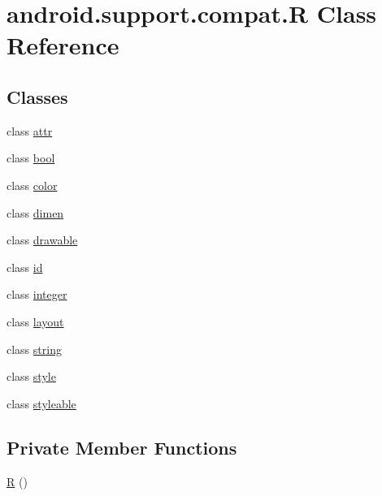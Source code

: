 \hypertarget{classandroid_1_1support_1_1compat_1_1_r}{}\section{android.\+support.\+compat.\+R Class Reference}
\label{classandroid_1_1support_1_1compat_1_1_r}
\subsection*{Classes}
\begin{DoxyCompactItemize}
\item 
class \mbox{\hyperlink{classandroid_1_1support_1_1compat_1_1_r_1_1attr}{attr}}
\item 
class \mbox{\hyperlink{classandroid_1_1support_1_1compat_1_1_r_1_1bool}{bool}}
\item 
class \mbox{\hyperlink{classandroid_1_1support_1_1compat_1_1_r_1_1color}{color}}
\item 
class \mbox{\hyperlink{classandroid_1_1support_1_1compat_1_1_r_1_1dimen}{dimen}}
\item 
class \mbox{\hyperlink{classandroid_1_1support_1_1compat_1_1_r_1_1drawable}{drawable}}
\item 
class \mbox{\hyperlink{classandroid_1_1support_1_1compat_1_1_r_1_1id}{id}}
\item 
class \mbox{\hyperlink{classandroid_1_1support_1_1compat_1_1_r_1_1integer}{integer}}
\item 
class \mbox{\hyperlink{classandroid_1_1support_1_1compat_1_1_r_1_1layout}{layout}}
\item 
class \mbox{\hyperlink{classandroid_1_1support_1_1compat_1_1_r_1_1string}{string}}
\item 
class \mbox{\hyperlink{classandroid_1_1support_1_1compat_1_1_r_1_1style}{style}}
\item 
class \mbox{\hyperlink{classandroid_1_1support_1_1compat_1_1_r_1_1styleable}{styleable}}
\end{DoxyCompactItemize}
\subsection*{Private Member Functions}
\begin{DoxyCompactItemize}
\item 
\mbox{\hyperlink{classandroid_1_1support_1_1compat_1_1_r_a5ccf4b4efeb034ade53739f6a3deee4d}{R}} ()
\end{DoxyCompactItemize}


